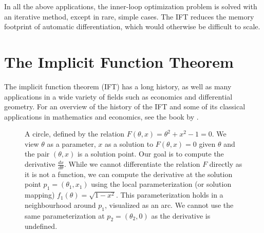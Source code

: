 \documentclass[11pt]{article}
\begin{document}
In all the above applications, the inner-loop optimization problem is solved
with an iterative method, except in rare, simple cases.
The IFT reduces the memory footprint of automatic differentiation,
which would otherwise be difficult to scale.

\section{The Implicit Function Theorem}
The implicit function theorem (IFT) has a long history, as well as many applications
in a wide variety of fields such as economics and differential geometry.
For an overview of the history of the IFT and some of its classical applications
in mathematics and economics,
see the book by \citet{iftbook}.

\begin{figure}
\centering
{}
\caption{
\label{fig:circle}
A circle, defined by the relation $F(\theta,x) = \theta^2 + x^2 - 1 = 0$.
We view $\theta$ as a parameter, $x$ as a solution to $F(\theta,x)=0$ given $\theta$
and the pair $(\theta,x)$ is a solution point.
Our goal is to compute the derivative $\frac{dx}{d\theta}$.
While we cannot differentiate the relation $F$ directly as it is not a function,
we can compute the derivative at the solution point $p_1 = (\theta_1,x_1)$
using the local parameterization (or solution mapping) $f_1(\theta)=\sqrt{1-x^2}$.
This parameterization holds
in a neighbourhood around $p_1$, visualized as an arc.
We cannot use the same parameterization at $p_2 = (\theta_2, 0)$ as the derivative is undefined.
}
\end{figure}
\end{document}
